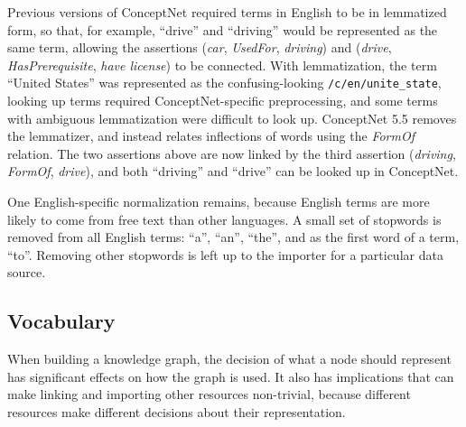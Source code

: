 \documentclass[letterpaper]{article}
\begin{document}

Previous versions of ConceptNet required terms in English to be in lemmatized
form, so that, for example, ``drive'' and ``driving'' would be represented as
the same term, allowing the assertions (\emph{car}, \emph{UsedFor},
\emph{driving}) and (\emph{drive}, \emph{HasPrerequisite}, \emph{have license})
to be connected. With lemmatization, the term ``United States'' was represented
as the confusing-looking \texttt{/c/en/unite\_state}, looking up terms required
ConceptNet-specific preprocessing, and some terms with ambiguous lemmatization
were difficult to look up. ConceptNet 5.5 removes the lemmatizer, and instead
relates inflections of words using the \emph{FormOf} relation. The two
assertions above are now linked by the third assertion (\emph{driving},
\emph{FormOf}, \emph{drive}), and both ``driving'' and ``drive'' can be looked
up in ConceptNet.

One English-specific normalization remains, because English terms are
more likely to come from free text than other languages. A small set of
stopwords is removed from all English terms: ``a'', ``an'', ``the'', and
as the first word of a term, ``to''. Removing other stopwords is left up
to the importer for a particular data source.


\subsection{Vocabulary}\label{vocabulary}

When building a knowledge graph, the decision of what a node should
represent has significant effects on how the graph is used. It also has
implications that can make linking and importing other resources
non-trivial, because different resources make different decisions about
their representation.
\end{document}
